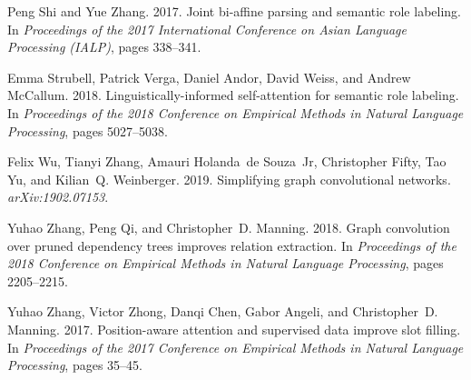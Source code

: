 \documentclass[11pt,a4paper]{article}
\begin{document}
\begin{thebibliography}{25}
Peng Shi and Yue Zhang. 2017.
\newblock Joint bi-affine parsing and semantic role labeling.
\newblock In \emph{Proceedings of the 2017 International Conference on Asian
  Language Processing (IALP)}, pages 338--341.

Emma Strubell, Patrick Verga, Daniel Andor, David Weiss, and Andrew McCallum.
  2018.
\newblock Linguistically-informed self-attention for semantic role labeling.
\newblock In \emph{Proceedings of the 2018 Conference on Empirical Methods in
  Natural Language Processing}, pages 5027--5038.

Felix Wu, Tianyi Zhang, Amauri Holanda~de Souza~Jr, Christopher Fifty, Tao Yu,
  and Kilian~Q. Weinberger. 2019.
\newblock Simplifying graph convolutional networks.
\newblock \emph{arXiv:1902.07153}.

Yuhao Zhang, Peng Qi, and Christopher~D. Manning. 2018.
\newblock Graph convolution over pruned dependency trees improves relation
  extraction.
\newblock In \emph{Proceedings of the 2018 Conference on Empirical Methods in
  Natural Language Processing}, pages 2205--2215.

Yuhao Zhang, Victor Zhong, Danqi Chen, Gabor Angeli, and Christopher~D.
  Manning. 2017.
\newblock Position-aware attention and supervised data improve slot filling.
\newblock In \emph{Proceedings of the 2017 Conference on Empirical Methods in
  Natural Language Processing}, pages 35--45.

\end{thebibliography}
\end{document}
